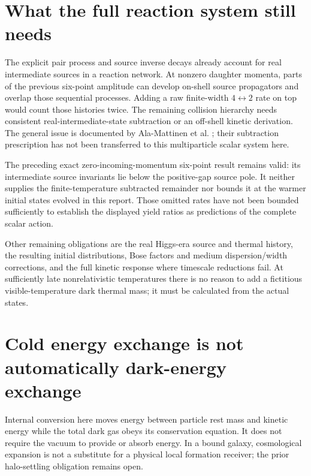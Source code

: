 \documentclass[11pt]{article}
\begin{document}
\section{What the full reaction system still needs}
The explicit pair process and source inverse decays already account for
real intermediate sources in a reaction network. At nonzero daughter
momenta, parts of the previous six-point amplitude can develop on-shell
source propagators and overlap those sequential processes. Adding a raw
finite-width $4\leftrightarrow2$ rate on top would count those histories twice.
The remaining collision hierarchy needs consistent real-intermediate-state
subtraction or an off-shell kinetic derivation. The general issue is
documented by Ala-Mattinen et al. \cite{ris}; their subtraction prescription
has not been transferred to this multiparticle scalar system here.

The preceding exact zero-incoming-momentum six-point result remains valid:
its intermediate source invariants lie below the positive-gap source pole.
It neither supplies the finite-temperature subtracted remainder nor bounds
it at the warmer initial states evolved in this report. Those omitted
rates have not been bounded sufficiently to establish the displayed yield
ratios as predictions of the complete scalar action.

Other remaining obligations are the real Higgs-era source and thermal
history, the resulting initial distributions, Bose factors and medium
dispersion/width corrections, and the full kinetic response where timescale
reductions fail. At sufficiently late nonrelativistic temperatures there
is no reason to add a fictitious visible-temperature dark thermal mass;
it must be calculated from the actual states.

\section{Cold energy exchange is not automatically dark-energy exchange}
Internal conversion here moves energy between particle rest mass and
kinetic energy while the total dark gas obeys its conservation equation.
It does not require the vacuum to provide or absorb energy. In a bound
galaxy, cosmological expansion is not a substitute for a physical local
formation receiver; the prior halo-settling obligation remains open.
\end{document}
